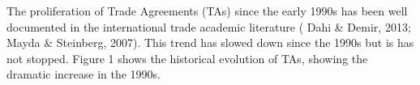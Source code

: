 The proliferation of Trade Agreements (TAs) since the early 1990s has
been well documented in the international trade academic literature
(\cite{dahi_preferential_2013} Dahi \& Demir, 2013; \cite{mayda_south-south_2007} Mayda \& Steinberg, 2007). This trend has slowed
down since the 1990s but is has not stopped. Figure 1 shows the historical
evolution of TAs, showing the dramatic increase in the 1990s.